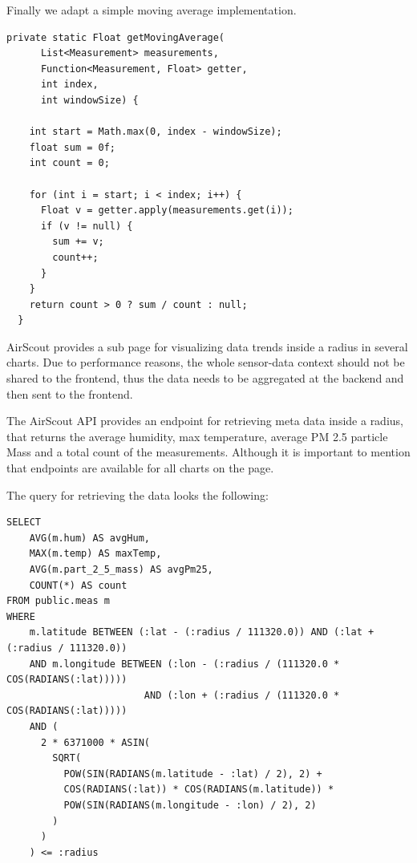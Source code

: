 Finally we adapt a simple moving average implementation.

\begin{lstlisting}[language={[AS]Java},caption=Implementation of the Moving Average Filter]
    private static Float getMovingAverage(
      List<Measurement> measurements,
      Function<Measurement, Float> getter,
      int index,
      int windowSize) {

    int start = Math.max(0, index - windowSize);
    float sum = 0f;
    int count = 0;

    for (int i = start; i < index; i++) {
      Float v = getter.apply(measurements.get(i));
      if (v != null) {
        sum += v;
        count++;
      }
    }
    return count > 0 ? sum / count : null;
  }
\end{lstlisting}

AirScout provides a sub page for visualizing data trends inside a radius in several charts. Due to performance reasons, the whole sensor-data context should not be shared to the frontend, thus the data needs to be aggregated at the backend and then sent to the frontend.

The AirScout API provides an endpoint for retrieving meta data inside a radius, that returns the average humidity, max temperature, average PM 2.5 particle Mass and a total count of the measurements. Although it is important to mention that endpoints are available for all charts on the page.

The query for retrieving the data looks the following:
\begin{lstlisting}[language=PGTSSQL,caption=Query for retrieving meta data inside radius]
SELECT
    AVG(m.hum) AS avgHum,
    MAX(m.temp) AS maxTemp,
    AVG(m.part_2_5_mass) AS avgPm25,
    COUNT(*) AS count
FROM public.meas m
WHERE
    m.latitude BETWEEN (:lat - (:radius / 111320.0)) AND (:lat + (:radius / 111320.0))
    AND m.longitude BETWEEN (:lon - (:radius / (111320.0 * COS(RADIANS(:lat)))))
                        AND (:lon + (:radius / (111320.0 * COS(RADIANS(:lat)))))
    AND (
      2 * 6371000 * ASIN(
        SQRT(
          POW(SIN(RADIANS(m.latitude - :lat) / 2), 2) +
          COS(RADIANS(:lat)) * COS(RADIANS(m.latitude)) *
          POW(SIN(RADIANS(m.longitude - :lon) / 2), 2)
        )
      )
    ) <= :radius
\end{lstlisting}